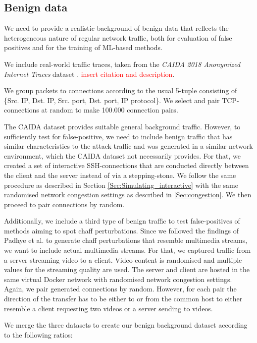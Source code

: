 \documentclass[runningheads]{llncs}\usepackage[]{graphicx}\usepackage[]{color}
\begin{document}
 
\subsection{Benign data}

We need to provide a realistic background of benign data that reflects the heterogeneous nature of regular network traffic, both for evaluation of false positives and for the training of ML-based methods.

We include real-world traffic traces, taken from the \textit{CAIDA 2018 Anonymized Internet Traces} dataset \cite{CAIDA2018}.
\textcolor{red}{insert citation and description}. 

We group packets to connections according to the usual 5-tuple consisting of \{Src. IP, Dst. IP, Src. port, Dst. port, IP protocol\}. We select and pair TCP-connections at random to make 100.000 connection pairs. 

The CAIDA dataset provides suitable general background traffic. However, to sufficiently test for false-positive, we need to include benign traffic that has similar characteristics to the attack traffic and was generated in a similar network environment, which the CAIDA dataset not necessarily provides. For that, we created a set of interactive SSH-connections that are conducted directly between the client and the server instead of via a stepping-stone. We follow the same procedure as described in Section \ref{Sec:Simulating_interactive} with the same randomised network congestion settings as described in \ref{Sec:congestion}. We then proceed to pair connections by random.

Additionally, we include a third type of benign traffic to test false-positives of methods aiming to spot chaff perturbations. Since we followed the findings of Padhye et al. \cite{padhye2010evading} to generate chaff perturbations that resemble multimedia streams, we want to include actual multimedia streams. For that, we captured traffic from a server streaming video to a client. Video content is randomised and multiple values for the streaming quality are used.
The server and client are hosted in the same virtual Docker network with randomised network congestion settings. Again, we pair generated connections by random. However, for each pair the direction of the transfer has to be either to or from the common host to either resemble a client requesting two videos or a server sending to videos.

We merge the three datasets to create our benign background dataset according to the following ratios:
\end{document}
